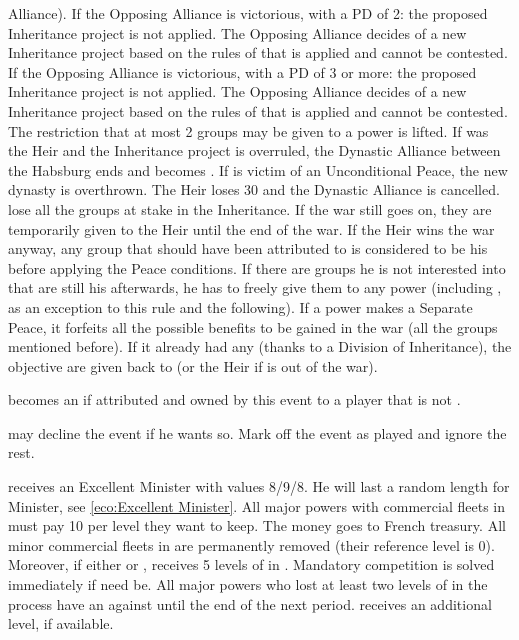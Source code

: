 \begin{digressions}
  Alliance).
  \aparag If the Opposing Alliance is victorious, with a PD of 2: the proposed
  Inheritance project is not applied. The Opposing Alliance decides of a new
  Inheritance project based on the rules of  that is applied and cannot be contested.
  \aparag If the Opposing Alliance is victorious, with a PD of 3 or more: the
  proposed Inheritance project is not applied. The Opposing Alliance decides
  of a new Inheritance project based on the rules of
   that is applied and cannot be
  contested. The restriction that at most 2 groups may be given to a power is
  lifted.
  \aparag If \HAB was the Heir and the Inheritance project is overruled, the
  Dynastic Alliance between the Habsburg ends and \AUSmin becomes \AUS.
  \aparag If \SPA is victim of an Unconditional Peace, the new dynasty is
  overthrown.
  \bparag The Heir loses 30 \PV and the Dynastic Alliance is cancelled.
  \bparag \SPA lose all the groups at stake in the Inheritance.
  \bparag If the war still goes on, they are temporarily given to the Heir
  until the end of the war.  If the Heir wins the war anyway, any group that
  should have been attributed to \SPA is considered to be his before applying
  the Peace conditions.  If there are groups he is not interested into that
  are still his afterwards, he has to freely give them to any power (including
  \SPA, as an exception to this rule and the following).
  \aparag If a power makes a Separate Peace, it forfeits all the possible
  benefits to be gained in the war (all the groups mentioned before).
  \bparag If it already had any (thanks to a Division of Inheritance), the
  objective are given back to \SPA (or the Heir if \SPA is out of the war).

  \effetlong
  \aparag \provinceGibraltar becomes an  if attributed and
  owned by this event to a player that is not \SPA.
\end{digressions}





\condition{}
\aparag \FRA may decline the event if he wants so. Mark off the event as
played and ignore the rest.

\phevnt
\aparag \FRA receives an Excellent Minister  with
values 8/9/8. He will last a random length for Minister, see
\ref{eco:Excellent Minister}.
\aparag All major powers with commercial fleets in  must pay 10
\ducats per level they want to keep. The money goes to French treasury. All
minor commercial fleets in  are permanently removed (their
reference level is 0).
\aparag Moreover, if either \CATHCR or \CATHCO, \FRA receives 5 levels of
\TradeFLEET in .  Mandatory competition is solved immediately if
need be.
\aparag All major powers who lost at least two levels of \TradeFLEET in the
process have an \OCB against \FRA until the end of the next period.
\aparag \FRA receives an additional  \MNU level, if available.

